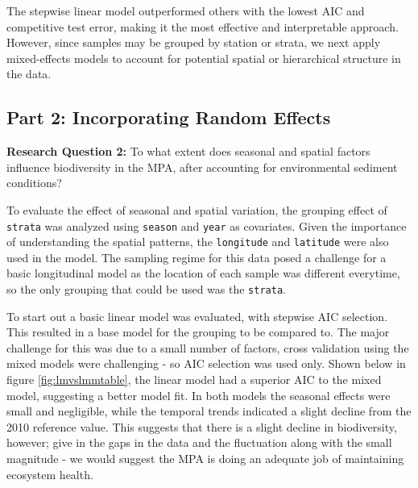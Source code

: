 \documentclass[12pt]{article}
\begin{document}
\qquad The stepwise linear model outperformed others with the lowest AIC and competitive test error, making it the most effective and interpretable approach. However, since samples may be grouped by station or strata, we next apply mixed-effects models to account for potential spatial or hierarchical structure in the data.

\subsection{Part 2: Incorporating Random Effects}

\textbf{Research Question 2: } To what extent does seasonal and spatial factors
influence biodiversity in the MPA, after accounting for environmental sediment
conditions?

To evaluate the effect of seasonal and spatial variation, the grouping effect of
\texttt{strata} was analyzed using  \texttt{season} and  \texttt{year} as
covariates. Given the importance  of understanding the spatial patterns, the \texttt{longitude} and \texttt{latitude} were also used in the
model. The sampling regime for this data posed a challenge for a basic longitudinal
model as the location of each sample was different everytime, so the only
grouping that could be used was the \texttt{strata}.


To start out a basic linear model was evaluated, with stepwise AIC selection.
This resulted in a base model for the grouping to be compared to. The major
challenge for this was due to a small number of factors, cross validation using
the mixed models were challenging - so AIC selection was used only. Shown below
in figure \ref{fig:lmvslmmtable}, the linear model had a superior AIC to the mixed model, suggesting a better
model fit. In both models the seasonal effects were small and negligible, while
the temporal trends indicated a slight decline from the 2010 reference value.
This suggests that there is a slight decline in biodiversity, however; give in
the gaps in the data and the fluctuation along with the small magnitude - we
would suggest the MPA is doing an adequate job of maintaining ecosystem health.
\end{document}

